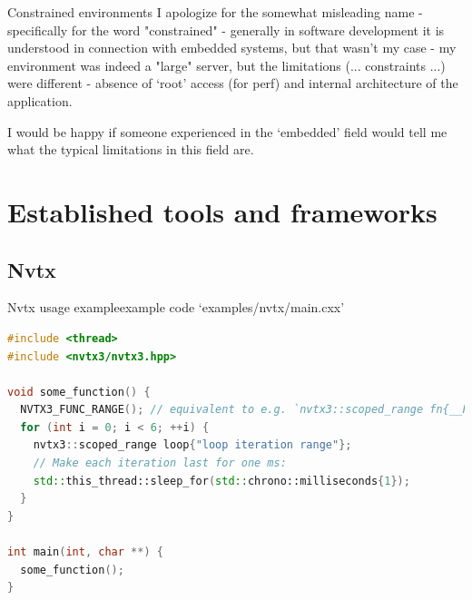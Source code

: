 \documentclass[aspectratio=169]{beamer}
\begin{document}
\begin{frame}{Constrained environments}
    I apologize for the somewhat misleading name - specifically for the word "constrained" - generally in software development it is understood in connection with embedded systems, but that wasn't my case - my environment was indeed a "large" server, but the limitations (... constraints ...) were different - absence of `root' access (for perf) and internal architecture of the application.

    I would be happy if someone experienced in the `embedded' field would tell me what the typical limitations in this field are.

\end{frame}



\section{Established tools and frameworks}


\subsection{Nvtx}

\begin{frame}[fragile]{Nvtx usage example}{example code `examples/nvtx/main.cxx'}
    
    \begin{lstlisting}[language=C++]
#include <thread>
#include <nvtx3/nvtx3.hpp>

void some_function() {
  NVTX3_FUNC_RANGE(); // equivalent to e.g. `nvtx3::scoped_range fn{__FUNCTION__};'
  for (int i = 0; i < 6; ++i) {
    nvtx3::scoped_range loop{"loop iteration range"};
    // Make each iteration last for one ms:
    std::this_thread::sleep_for(std::chrono::milliseconds{1});
  }
}

int main(int, char **) {
  some_function();
}
    \end{lstlisting}

\end{frame}
\end{document}
